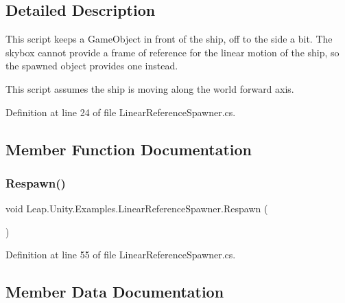 \subsection{Detailed Description}
This script keeps a Game\+Object in front of the ship, off to the side a bit. The skybox cannot provide a frame of reference for the linear motion of the ship, so the spawned object provides one instead. 

This script assumes the ship is moving along the world forward axis. 

Definition at line 24 of file Linear\+Reference\+Spawner.\+cs.



\subsection{Member Function Documentation}
\mbox{\label{class_leap_1_1_unity_1_1_examples_1_1_linear_reference_spawner_a84df0998436c0604d704a3e9c1b9ac97}} 
\subsubsection{\texorpdfstring{Respawn()}{Respawn()}}
{\footnotesize\ttfamily void Leap.\+Unity.\+Examples.\+Linear\+Reference\+Spawner.\+Respawn (\begin{DoxyParamCaption}{ }\end{DoxyParamCaption})}



Definition at line 55 of file Linear\+Reference\+Spawner.\+cs.



\subsection{Member Data Documentation}
\mbox{\label{class_leap_1_1_unity_1_1_examples_1_1_linear_reference_spawner_ac277cb8c99897a41ab292e97cba3e425}} 
